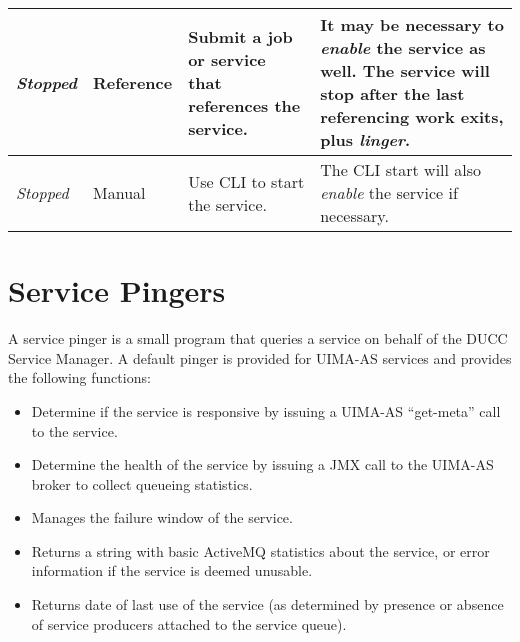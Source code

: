 \begin{tabular}{| l | l | p{6cm} | p{6cm} |}
        \hline
        {\em Stopped} & Reference    & Submit a job or service that references the service. & It may be necessary to {\em enable} the service as well. 
                                       The service will stop after the last referencing work exits, plus {\em linger}.  \\
        \hline
        {\em Stopped} & Manual       & Use CLI to start the service. &  The CLI start will also {\em enable} the service if necessary. \\
        \hline
      \end{tabular}
      
      \section{Service Pingers}
      \label{sec:service.pingers}
      A service pinger is a small program that queries a service on behalf of the DUCC Service
      Manager.  A default pinger is provided for UIMA-AS services and provides the following
      functions:
      \begin{itemize}
        \item Determine if the service is responsive by issuing a UIMA-AS ``get-meta'' call 
          to the service.
        \item Determine the health of the service by issuing a JMX call to the UIMA-AS broker
          to collect queueing statistics.
        \item Manages the failure window of the service.
        \item Returns a string with basic ActiveMQ statistics about the service, or
          error information if the service is deemed unusable.
        \item Returns date of last use of the service (as determined by presence or
          absence of service producers attached to the service queue).
      \end{itemize}

